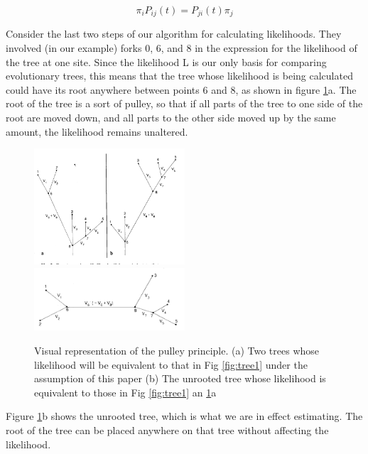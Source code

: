 \begin{equation}
\pi_i P_{ij}(t) = P_{ji}(t) \pi_j
\end{equation}

Consider the last two steps of our algorithm for calculating likelihoods.
They involved (in our example) forks 0, 6, and 8 in the expression for the likelihood of the tree at one site.
Since the likelihood L is our only basis for comparing evolutionary trees, this means that the tree whose likelihood is being calculated could have its root anywhere between points 6 and 8, as shown in figure \ref{fig:pulley}a. The root of the tree is a sort of pulley, so that if all parts of the tree to one side of the root are moved down, and all parts to the other side moved up by the same amount, the likelihood remains unaltered.


\begin{figure}[H]
		\centering
		\includegraphics[width=0.5\textwidth]{tree2.png}
		\includegraphics[width=0.5\textwidth]{tree3.png}
		\caption{Visual representation of the pulley principle. (a) Two trees whose likelihood will be equivalent to that in Fig \ref{fig:tree1} under the assumption of this paper (b) The unrooted tree whose likelihood is equivalent to those in Fig \ref{fig:tree1} an \ref{fig:pulley}a }
		\label{fig:pulley}
	\end{figure}


Figure \ref{fig:pulley}b shows the unrooted tree, which is what we are in effect estimating.
The root of the tree can be placed anywhere on that tree without affecting the likelihood.

